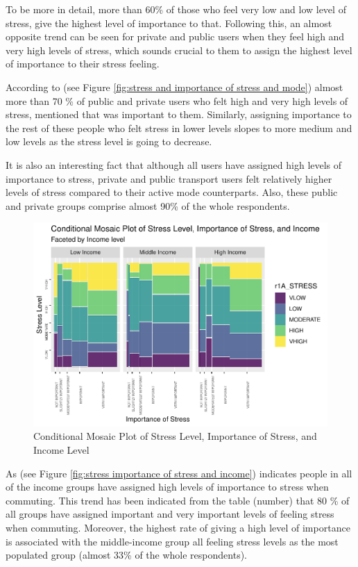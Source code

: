 \documentclass[
11pt, %
oneside, %
english, %
singlespacing, %
]{macthesis} %
\begin{document}
To be more in detail, more than 60\% of those who feel very low and low level of stress, give the highest level of importance to that. Following this, an almost opposite trend can be seen for private and public users when they feel high and very high levels of stress, which sounds crucial to them to assign the highest level of importance to their stress feeling.

According to (see Figure \ref{fig:stress and importance of stress and mode}) almost more than 70 \% of public and private users who felt high and very high levels of stress, mentioned that was important to them. Similarly, assigning importance to the rest of these people who felt stress in lower levels slopes to more medium and low levels as the stress level is going to decrease.

It is also an interesting fact that although all users have assigned high levels of importance to stress, private and public transport users felt relatively higher levels of stress compared to their active mode counterparts. Also, these public and private groups comprise almost 90\% of the whole respondents.
\begin{figure}
\includegraphics[width=0.85\linewidth]{thesis_files/figure-latex/unnamed-chunk-26-1} \caption{\label{fig:stress importance of stress and income}Conditional Mosaic Plot of Stress Level, Importance of Stress, and Income Level}\label{fig:unnamed-chunk-26}
\end{figure}
As (see Figure \ref{fig:stress importance of stress and income}) indicates people in all of the income groups have assigned high levels of importance to stress when commuting. This trend has been indicated from the table (number) that 80 \% of all groups have assigned important and very important levels of feeling stress when commuting. Moreover, the highest rate of giving a high level of importance is associated with the middle-income group all feeling stress levels as the most populated group (almost 33\% of the whole respondents).
\end{document}
